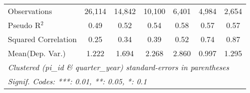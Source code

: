 \begin{tabular}{lcccccc}
   Observations                                               & 26,114  & 14,842         & 10,100  & 6,401   & 4,984   & 2,654\\  
   Pseudo R$^2$                                               & 0.49    & 0.52           & 0.54    & 0.58    & 0.57    & 0.57\\  
   Squared Correlation                                        & 0.25    & 0.34           & 0.39    & 0.52    & 0.74    & 0.87\\  
Mean(Dep. Var.) & 1.222 & 1.694 & 2.268 & 2.860 & 0.997 & 1.295 \\
   \midrule \midrule
   \multicolumn{7}{l}{\emph{Clustered (pi\_id \& quarter\_year) standard-errors in parentheses}}\\
   \multicolumn{7}{l}{\emph{Signif. Codes: ***: 0.01, **: 0.05, *: 0.1}}\\
\end{tabular}
\par\endgroup
